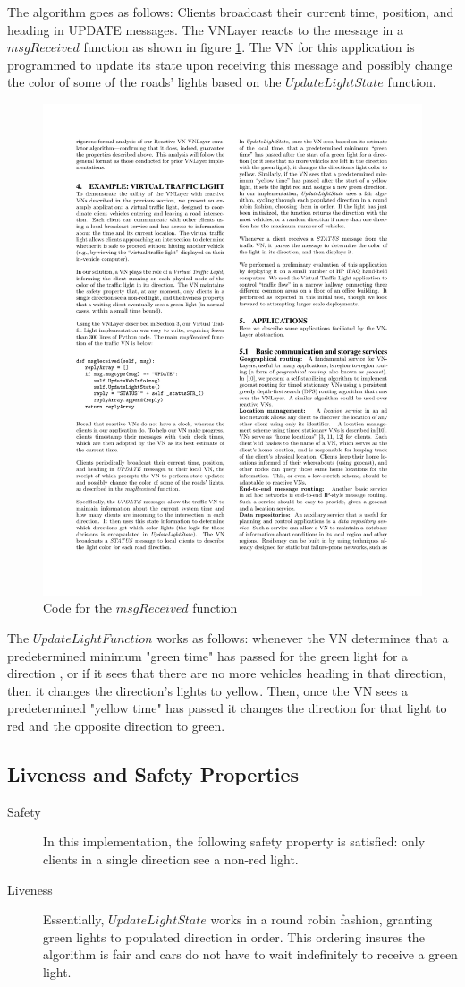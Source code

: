 \documentclass[12pt]{article}
\begin{document}
The algorithm goes as follows:  Clients broadcast their current time, position, and heading in UPDATE messages.  The VNLayer reacts to the message in a $msgReceived$ function as shown in figure \ref{fig:vnlayerAlg}.  The VN for this application is programmed to update its state upon receiving this message and possibly change the color of some of the roads' lights based on the $UpdateLightState$ function. 

\begin{figure}
\includegraphics[width=.65\textwidth]{vnlayerAlg.pdf}
\caption{Code for the $msgReceived$ function \cite{vnlayer}}
\label{fig:vnlayerAlg}
\end{figure}
The $UpdateLightFunction$ works as follows: whenever the VN determines that a predetermined minimum "green time" has passed for the green light for a direction , or if it sees that there are no more vehicles heading in that direction, then it changes the direction's lights to yellow.  Then, once the VN sees a predetermined "yellow time" has passed it changes the direction for that light to red and the opposite direction to green.  

\subsection{Liveness and Safety Properties}
\begin{description}
\item[Safety]
 In this implementation, the following safety property is satisfied: only clients in a single direction see a non-red light.
\item[Liveness] 
 Essentially, $UpdateLightState$ works in a round robin fashion, granting green lights to populated direction in order.  This ordering insures the algorithm is fair and cars do not have to wait indefinitely to receive a green light. 
\end{description}
\end{document}
